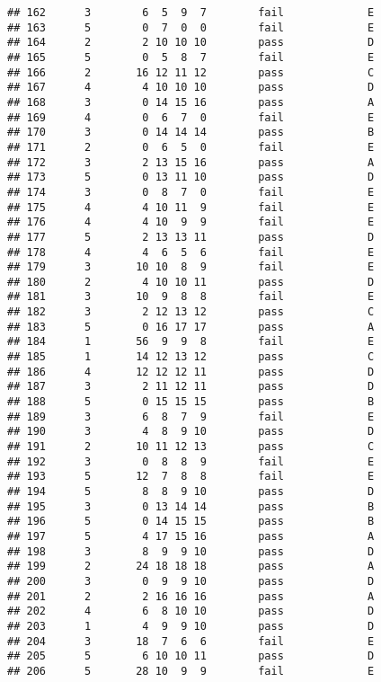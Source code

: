 \documentclass[
]{article}
\begin{document}
\begin{verbatim}
## 162      3        6  5  9  7        fail             E
## 163      5        0  7  0  0        fail             E
## 164      2        2 10 10 10        pass             D
## 165      5        0  5  8  7        fail             E
## 166      2       16 12 11 12        pass             C
## 167      4        4 10 10 10        pass             D
## 168      3        0 14 15 16        pass             A
## 169      4        0  6  7  0        fail             E
## 170      3        0 14 14 14        pass             B
## 171      2        0  6  5  0        fail             E
## 172      3        2 13 15 16        pass             A
## 173      5        0 13 11 10        pass             D
## 174      3        0  8  7  0        fail             E
## 175      4        4 10 11  9        fail             E
## 176      4        4 10  9  9        fail             E
## 177      5        2 13 13 11        pass             D
## 178      4        4  6  5  6        fail             E
## 179      3       10 10  8  9        fail             E
## 180      2        4 10 10 11        pass             D
## 181      3       10  9  8  8        fail             E
## 182      3        2 12 13 12        pass             C
## 183      5        0 16 17 17        pass             A
## 184      1       56  9  9  8        fail             E
## 185      1       14 12 13 12        pass             C
## 186      4       12 12 12 11        pass             D
## 187      3        2 11 12 11        pass             D
## 188      5        0 15 15 15        pass             B
## 189      3        6  8  7  9        fail             E
## 190      3        4  8  9 10        pass             D
## 191      2       10 11 12 13        pass             C
## 192      3        0  8  8  9        fail             E
## 193      5       12  7  8  8        fail             E
## 194      5        8  8  9 10        pass             D
## 195      3        0 13 14 14        pass             B
## 196      5        0 14 15 15        pass             B
## 197      5        4 17 15 16        pass             A
## 198      3        8  9  9 10        pass             D
## 199      2       24 18 18 18        pass             A
## 200      3        0  9  9 10        pass             D
## 201      2        2 16 16 16        pass             A
## 202      4        6  8 10 10        pass             D
## 203      1        4  9  9 10        pass             D
## 204      3       18  7  6  6        fail             E
## 205      5        6 10 10 11        pass             D
## 206      5       28 10  9  9        fail             E

\end{verbatim}
\end{document}
